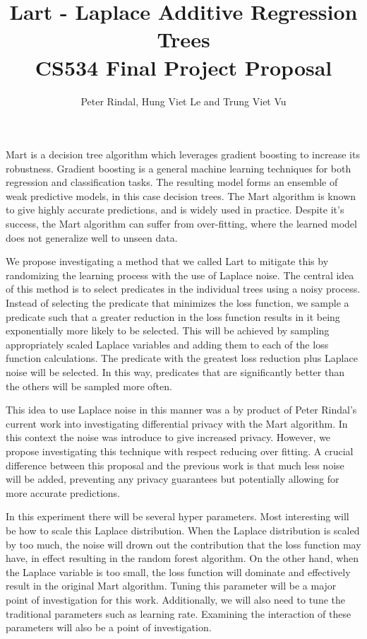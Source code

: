 \documentclass[]{scrartcl}
\title{Lart - Laplace Additive Regression Trees\\ \vspace{0.4cm}
	\large CS534 Final Project Proposal}
\author{Peter Rindal, Hung Viet Le and Trung Viet Vu}
\begin{document}
\maketitle

Mart \cite{friedman2003multiple} is a decision tree algorithm which leverages gradient boosting to increase its robustness. Gradient boosting is a general machine learning techniques for both regression and classification tasks. The resulting model forms an ensemble of weak predictive models, in this case decision trees.   The Mart algorithm is known to give highly accurate predictions\cite{rashmi2015dart}, and is widely used in practice. Despite it's success, the Mart algorithm can suffer from over-fitting, where the learned model does not generalize well to unseen data.

We propose investigating a method that we called Lart to mitigate this by randomizing the learning process with the use of Laplace noise. The central idea of this method is to select predicates in the individual trees using a noisy process. Instead of selecting the predicate that minimizes the loss function, we sample a predicate such that a greater reduction in the loss function results in it being exponentially more likely to be selected. This will be achieved by sampling appropriately scaled Laplace variables and adding them to each of the loss function calculations. The predicate with the greatest loss reduction plus Laplace noise will be selected. In this way, predicates that are significantly better than the others will be sampled more often.

This idea to use Laplace noise in this manner was a by product of Peter Rindal's current work into investigating differential privacy with the Mart algorithm. In this context the noise was introduce to give increased privacy. However, we propose investigating this technique with respect reducing over fitting. A crucial difference between this proposal and the previous work is that much less noise will be added, preventing any privacy guarantees but potentially allowing for more accurate predictions.

In  this experiment there will be several hyper parameters. Most interesting will be how to scale this Laplace distribution. When the Laplace distribution is scaled by too much, the noise will drown out the contribution that the loss function may have, in effect resulting in the random forest algorithm. On the other hand, when the Laplace variable is too small, the loss function will dominate and effectively result in the original Mart algorithm. Tuning this parameter will be a major point of investigation for this work. Additionally, we will also need to tune the traditional parameters such as learning rate. Examining the interaction of these parameters will also be a point of investigation.
\end{document}
